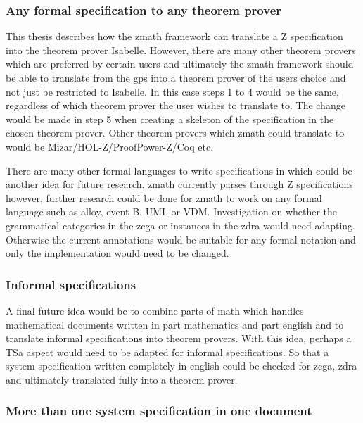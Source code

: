 \subsubsection{Any formal specification to any theorem prover}
\label{subsubsec:anyformanythe}

This thesis describes how the \gls{zmath} framework can translate a Z
specification into the theorem prover Isabelle. However, there are many other
theorem provers which are preferred by certain users and ultimately the
\gls{zmath} framework should be able to translate from the \gls{gps} into a
theorem prover of the users choice and not just be restricted to Isabelle. In
this case steps 1 to 4 would be the same, regardless of which theorem prover the
user wishes to translate to. The change would be made in step 5 when creating a
skeleton of the specification in the chosen theorem prover. Other theorem
provers which \gls{zmath} could translate to would be
Mizar/HOL-Z/ProofPower-Z/Coq etc.

There are many other formal languages to write specifications in which could be
another idea for future research. \Gls{zmath} currently parses through Z
specifications however, further research could be done for \gls{zmath} to work on
any formal language such as alloy, event B, UML or VDM. Investigation on whether
the grammatical categories in the \gls{zcga} or instances in the \gls{zdra}
would need adapting. Otherwise the current annotations would be suitable for any
formal notation and only the implementation would need to be changed.

\subsubsection{Informal specifications}
\label{subsubsec:informalspecs}

A final future idea would be to combine parts of \gls{math} which handles
mathematical documents written in part mathematics and part english and to
translate informal specifications into theorem provers. With this idea, perhaps
a TSa aspect would need to be adapted for informal specifications. So that a
system specification written completely in english could be checked for
\gls{zcga}, \gls{zdra} and ultimately translated fully into a theorem prover.

\subsubsection{More than one system specification in one document}

